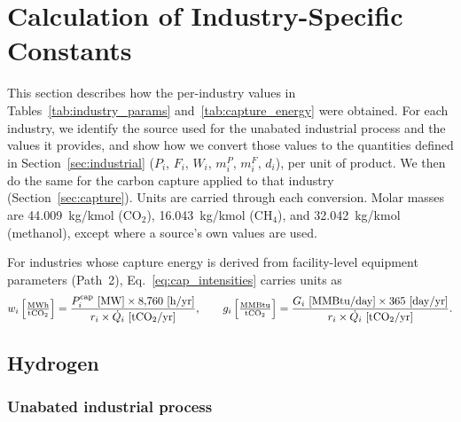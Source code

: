 \documentclass[11pt]{article}
\newcommand{\cotwo}{\ensuremath{\mathrm{CO_2}}}
\newcommand{\chfour}{\ensuremath{\mathrm{CH_4}}}
\begin{document}
\section{Calculation of Industry-Specific Constants}
\label{sec:constants}

This section describes how the per-industry values in Tables~\ref{tab:industry_params} and~\ref{tab:capture_energy} were obtained. For each industry, we identify the source used for the unabated industrial process and the values it provides, and show how we convert those values to the quantities defined in Section~\ref{sec:industrial} ($P_i$, $F_i$, $W_i$, $m_i^P$, $m_i^F$, $d_i$), per unit of product. We then do the same for the carbon capture applied to that industry (Section~\ref{sec:capture}). Units are carried through each conversion. Molar masses are 44.009~kg/kmol (\cotwo{}), 16.043~kg/kmol (\chfour{}), and 32.042~kg/kmol (methanol), except where a source's own values are used.

For industries whose capture energy is derived from facility-level equipment parameters (Path~2), Eq.~\eqref{eq:cap_intensities} carries units as
%
\[
  w_i\left[\tfrac{\text{MWh}}{\text{t\cotwo{}}}\right] = \frac{P_i^{\text{cap}}~[\text{MW}] \times 8{,}760~[\text{h/yr}]}{r_i \times \dot{Q}_i~[\text{t\cotwo{}/yr}]}, \qquad
  g_i\left[\tfrac{\text{MMBtu}}{\text{t\cotwo{}}}\right] = \frac{G_i~[\text{MMBtu/day}] \times 365~[\text{day/yr}]}{r_i \times \dot{Q}_i~[\text{t\cotwo{}/yr}]}.
\]

\subsection{Hydrogen}
\label{sec:const_h2}

\subsubsection{Unabated industrial process}
\end{document}

